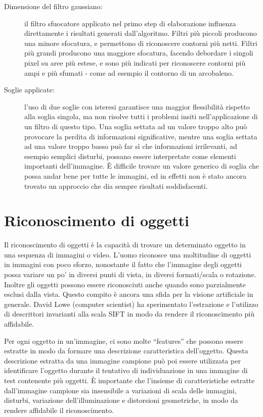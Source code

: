 \begin{description}
\item[Dimensione del filtro gaussiano:] il filtro sfuocatore applicato nel primo step di elaborazione influenza direttamente i risultati generati dall'algoritmo. Filtri più piccoli producono una minore sfocatura, e permettono di riconoscere contorni più netti. Filtri più grandi producono una maggiore sfocatura, facendo debordare i singoli pixel su aree più estese, e sono più indicati per riconoscere contorni più ampi e più sfumati - come ad esempio il contorno di un arcobaleno.
\item[Soglie applicate:] l'uso di due soglie con isteresi garantisce una maggior flessibilità rispetto alla soglia singola, ma non risolve tutti i problemi insiti nell'applicazione di un filtro di questo tipo. Una soglia settata ad un valore troppo alto può provocare la perdita di informazioni significative, mentre una soglia settata ad una valore troppo basso può far sì che informazioni irrilevanti, ad esempio semplici disturbi, possano essere interpretate come elementi importanti dell'immagine. È difficile trovare un valore generico di soglia che possa andar bene per tutte le immagini, ed in effetti non è stato ancora trovato un approccio che dia sempre risultati soddisfacenti.
\end{description}

\section{Riconoscimento di oggetti}
Il riconoscimento di oggetti è la capacità di trovare un determinato oggetto in una sequenza di immagini o video. L'uomo riconosce una moltitudine di oggetti in immagini con poco sforzo, nonostante il fatto che l'immagine degli oggetti possa variare un po' in diversi punti di vista, in diversi formati/scala o rotazione. Inoltre gli oggetti possono essere riconosciuti anche quando sono parzialmente esclusi dalla vista. Questo compito è ancora una sfida per la visione artificiale in generale. David Lowe (computer scientist) ha sperimentato l'estrazione e l'utilizzo di descrittori invarianti alla scala SIFT in modo da rendere il riconoscimento più affidabile\cite{Lowe:2004:DIF:993451.996342}.

Per ogni oggetto in un'immagine, ci sono molte ``features'' che possono essere estratte in modo da formare una descrizione caratteristica dell'oggetto. Questa descrizione estratta da una immagine campione può poi essere utilizzata per identificare l'oggetto durante il tentativo di individuazione in una immagine di test contenente più oggetti. È importante che l'insieme di caratteristiche estratte dall'immagine campione sia insensibile a variazioni di scala delle immagini, disturbi, variazione dell'illuminazione e distorsioni geometriche, in modo da rendere affidabile il riconoscimento.

